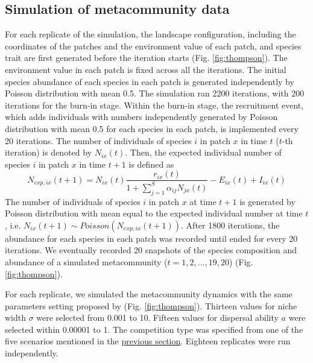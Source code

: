 \subsection{Simulation of metacommunity data \DIFaddbegin {}\DIFaddend }
\noindent
For each replicate of the simulation, the landscape configuration, including the coordinates of the patches and the environment value of each patch, and species trait are first generated before the iteration starts (Fig. \ref{fig:thompson}). The environment value in each patch is fixed across all the iterations. The initial species abundance of each species in each patch is generated independently by Poisson distribution with mean 0.5. The simulation ran 2200 iterations, with 200 iterations for the burn-in stage. Within the burn-in stage, the recruitment event, which adds individuals with numbers independently generated by Poisson distribution with mean 0.5 for each species in each patch, is implemented every 20 iterations. The number of individuals of species $i$ in patch $x$ in time $t$ ($t$-th iteration) is denoted by $N_{ix}(t)$. Then, the expected individual number of species $i$ in patch $x$ in time $t+1$ is defined as 
\[
N_{exp,ix}(t+1) = N_{ix}(t)\dfrac{r_{ix}(t)}{1+\sum_{j = 1}^S\alpha_{ij}N_{jx}(t)} - E_{ix}(t)+I_{ix}(t)
\]
The number of individuals of species $i$ in patch $x$ at time $t+1$ is generated by Poisson distribution with mean equal to the expected individual number at time $t$, i.e. $N_{ix}(t+1)\sim Poisson(N_{exp,ix}(t+1))$. After 1800 iterations, the abundance for each species in each patch was recorded until \DIFdelbegin {}\DIFdelend \DIFaddbegin {}\DIFaddend ended for every 20 iterations. We eventually recorded 20 snapshots of the species composition and abundance of a simulated metacommunity ($t = 1,2,...,19,20$) (Fig. \ref{fig:thompson}). 

For each replicate, we simulated the metacommunity dynamics with the same parameters setting proposed by \citet{thompson2020process} (Fig. \ref{fig:thompson}). Thirteen values for niche width $\sigma$ were selected from 0.001 to 10. Fifteen values for dispersal ability $a$ were selected within 0.00001 to 1. The competition type was specified from one of the five scenarios mentioned in the \hyperref[Modelc]{previous section}. Eighteen replicates were run independently.


